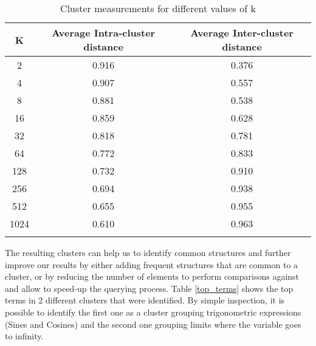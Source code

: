 \begin{longtable}{|c|c|c|}
\hline 
\textbf{K} & \textbf{Average Intra-cluster distance} & \textbf{Average Inter-cluster distance} \\ 
\hline 
2 & 0.916 & 0.376  \\ \hline 
4 & 0.907 & 0.557  \\ \hline 
8 & 0.881 & 0.538  \\ \hline 
16 & 0.859 & 0.628  \\ \hline 
32 & 0.818 & 0.781  \\ \hline 
64 & 0.772 & 0.833  \\ \hline 
128 & 0.732 & 0.910  \\ \hline 
256 & 0.694 & 0.938  \\ \hline 
512 & 0.655 & 0.955  \\ \hline 
1024 & 0.610 & 0.963  \\ \hline 
\caption{Cluster measurements for different values of k}
\label{cluster_measurements}
\end{longtable} 

The resulting clusters can help us to identify common structures and further improve our results by either adding frequent structures that are common to a cluster, or by reducing the number of elements to perform comparisons against and allow to speed-up the querying process.
Table \ref{top_terms} shows the top terms in 2 different clusters that were identified. By simple inspection, it is possible to identify the first one as a cluster grouping trigonometric expressions (Sines and Cosines) and the second one grouping limits where the variable goes to infinity.

